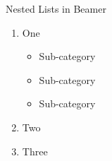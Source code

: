 
\begin{frame}{Nested Lists in Beamer}

    \begin{enumerate}
        \item One
        \begin{itemize}
            \item Sub-category
            \item Sub-category
            \item Sub-category
        \end{itemize}
        \item Two
        \item Three
    \end{enumerate}
    
\end{frame}